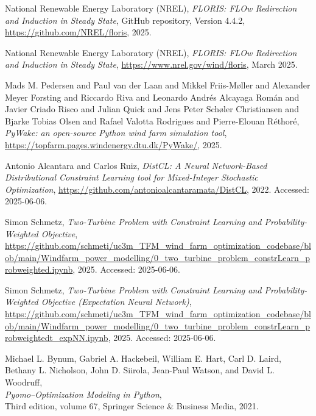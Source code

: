 \documentclass[preprint,12pt]{elsarticle}
\begin{document}
\begin{thebibliography}{00}
National Renewable Energy Laboratory (NREL),
\textit{FLORIS: FLOw Redirection and Induction in Steady State},
GitHub repository,
Version 4.4.2,
\url{https://github.com/NREL/floris},
2025.

National Renewable Energy Laboratory (NREL),
\textit{FLORIS: FLOw Redirection and Induction in Steady State},
\url{https://www.nrel.gov/wind/floris},
March 2025.

Mads M. Pedersen and Paul van der Laan and Mikkel Friis-Møller and Alexander Meyer Forsting and Riccardo Riva and Leonardo Andrés Alcayaga Román and Javier Criado Risco and Julian Quick and Jens Peter Schøler Christiansen and Bjarke Tobias Olsen and Rafael Valotta Rodrigues and Pierre-Elouan Réthoré,
\textit{PyWake: an open-source Python wind farm simulation tool},
\url{https://topfarm.pages.windenergy.dtu.dk/PyWake/},
2025.


Antonio Alcantara and Carlos Ruiz,
\textit{DistCL: A Neural Network-Based Distributional Constraint Learning tool for Mixed-Integer Stochastic Optimization},
\url{https://github.com/antonioalcantaramata/DistCL},
2022.
Accessed: 2025-06-06.

Simon Schmetz,
\textit{Two-Turbine Problem with Constraint Learning and Probability-Weighted Objective},
\url{https://github.com/schmeti/uc3m_TFM_wind_farm_optimization_codebase/blob/main/Windfarm_power_modelling/0_two_turbine_problem_constrLearn_probweighted.ipynb},
2025.
Accessed: 2025-06-06.

Simon Schmetz,
\textit{Two-Turbine Problem with Constraint Learning and Probability-Weighted Objective (Expectation Neural Network)},
\url{https://github.com/schmeti/uc3m_TFM_wind_farm_optimization_codebase/blob/main/Windfarm_power_modelling/0_two_turbine_problem_constrLearn_probweightedt_expNN.ipynb},
2025.
Accessed: 2025-06-06.

Michael L. Bynum, Gabriel A. Hackebeil, William E. Hart, Carl D. Laird, Bethany L. Nicholson, John D. Siirola, Jean-Paul Watson, and David L. Woodruff,\\
\textit{Pyomo--Optimization Modeling in Python},\\
Third edition, volume 67, Springer Science \& Business Media, 2021.


\end{thebibliography}
\end{document}

